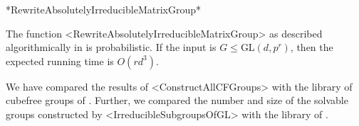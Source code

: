 *RewriteAbsolutelyIrreducibleMatrixGroup*

The function <RewriteAbsolutelyIrreducibleMatrixGroup> as described
algorithmically in
\cite{GlHo97} is probabilistic. If the input is $G\leq$GL$(d,p^r)$, then the
expected running time is $O(rd^3)$.



We have compared the results of <ConstructAllCFGroups> with the library of
cubefree groups of {\GrpConst}. Further, we compared the number and size of the
solvable groups constructed by <IrreducibleSubgroupsOfGL> with the library of {\Irredsol}.



